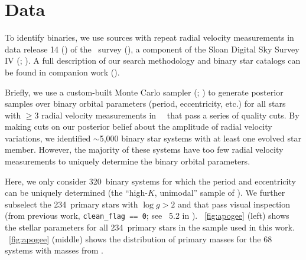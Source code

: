 \documentclass[modern, letterpaper]{aastex62}
\newcommand{\apogee}{\project{\acronym{APOGEE}}}
\newcommand{\sdssiv}{\project{\acronym{SDSS-IV}}}
\newcommand{\DR}{\acronym{DR14}}
\newcommand{\logg}{\ensuremath{\log g}}
\newcommand{\nunimodal}{320}
\newcommand{\nclean}{234}
\begin{document}

\section{Data} \label{sec:data}

To identify binaries, we use sources with repeat radial velocity measurements in
data release 14 (\DR) of the \apogee\ survey
(\citealt{Majewski:2017,Abolfathi:2017}), a component of the Sloan Digital Sky
Survey IV (\sdssiv; \citealt{Gunn:2006,Blanton:2017}).
A full description of our search methodology and binary star catalogs can be
found in companion work (\citealt{Price-Whelan:2018}).

Briefly, we use a custom-built Monte Carlo sampler (;
\citealt{Price-Whelan:2017}) to generate posterior samples over binary orbital
parameters (period, eccentricity, etc.) for all stars with $\geq 3$ radial
velocity measurements in \apogee\ \DR\ that pass a series of quality cuts.
By making cuts on our posterior belief about the amplitude of radial velocity
variations, we identified $\sim$5,000 binary star systems with at least one
evolved star member.
However, the majority of these systems have too few radial velocity measurements
to uniquely determine the binary orbital parameters.

Here, we only consider \nunimodal\ binary systems for which the period and
eccentricity can be uniquely determined (the ``high-$K$, unimodal'' sample of
\citealt{Price-Whelan:2018}).
We further subselect the \nclean\ primary stars with $\logg > 2$ and that pass
visual inspection (from previous work, \texttt{clean\_flag == 0}; see
\sectionname~5.2 in \citealt{Price-Whelan:2018}).
\figurename~\ref{fig:apogee} (left) shows the stellar parameters for all
\nclean\ primary stars in the sample used in this work.
\figurename~\ref{fig:apogee} (middle) shows the distribution of primary
masses for the 68 systems with masses from \cite{Ness:2015}.
\end{document}
